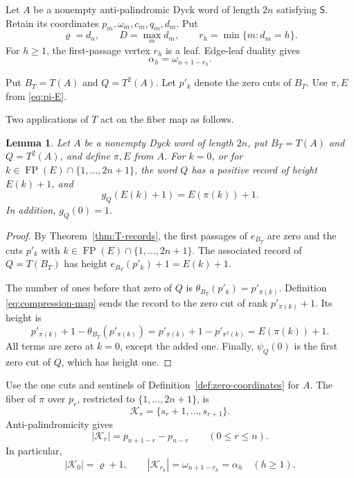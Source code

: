 \documentclass[11pt]{article}
\newtheorem{lemma}[theorem]{Lemma}
\theoremstyle{definition}
\theoremstyle{remark}
\DeclareMathOperator{\FP}{FP}
\begin{document}
Let \(A\) be a nonempty anti-palindromic Dyck word of length \(2n\) satisfying
\(\mathsf S\).  Retain
its coordinates \(p_m,\omega_m,c_m,q_m,d_m\).  Put
\[
 \varrho=d_n,
 \qquad D=\max_m d_m,
 \qquad r_h=\min\{m:d_m=h\}.
\]
For \(h\geq1\), the first-passage vertex \(r_h\) is a leaf.  Edge-leaf
duality gives
\begin{equation*}
 \alpha_h=\omega_{n+1-r_h}.
\end{equation*}

Put \(B_T=T(A)\) and \(Q=T^2(A)\).  Let \(p'_k\) denote the zero cuts of
\(B_T\).  Use \(\pi,E\) from \eqref{eq:pi-E}.

Two applications of $T$ act on the fiber map as follows.
\begin{lemma}
\label{lem:double-T-fibers}
Let \(A\) be a nonempty Dyck word of length \(2n\), put
\(B_T=T(A)\) and \(Q=T^2(A)\), and define \(\pi,E\) from \(A\).
For \(k=0\), or for
\(k\in\FP(E)\cap\{1,\ldots,2n+1\}\), the word \(Q\) has a positive record
of height \(E(k)+1\), and
\begin{equation*}
 g_Q(E(k)+1)=E(\pi(k))+1.
\end{equation*}
In addition, \(g_Q(0)=1\).
\end{lemma}

\begin{proof}
By Theorem~\ref{thm:T-records}, the first passages of \(e_{B_T}\) are zero
and the cuts \(p'_k\) with
\(k\in\FP(E)\cap\{1,\ldots,2n+1\}\).  The associated record of
\(Q=T(B_T)\) has height \(e_{B_T}(p'_k)+1=E(k)+1\).

The number of ones before that zero of \(Q\) is
\(\theta_{B_T}(p'_k)=p'_{\pi(k)}\).  Definition
\eqref{eq:compression-map} sends the record to the zero cut of rank
\(p'_{\pi(k)}+1\).  Its height is
\[
 p'_{\pi(k)}+1-\theta_{B_T}(p'_{\pi(k)})
 =p'_{\pi(k)}+1-p'_{\pi^2(k)}
 =E(\pi(k))+1.
\]
All terms are zero at \(k=0\), except the added one.  Finally,
\(\psi_Q(0)\) is the first zero cut of \(Q\), which has height one.
\end{proof}

Use the one cuts and sentinels of Definition~\ref{def:zero-coordinates} for
\(A\).
The fiber of \(\pi\) over \(p_r\), restricted to
\(\{1,\ldots,2n+1\}\), is
\begin{equation*}
 \mathcal K_r=\{s_r+1,\ldots,s_{r+1}\}.
\end{equation*}
Anti-palindromicity gives
\begin{equation*}
 |\mathcal K_r|=p_{n+1-r}-p_{n-r}
 \qquad(0\leq r\leq n).
\end{equation*}
In particular,
\begin{equation}
\label{eq:K-boundaries}
 |\mathcal K_0|=\varrho+1,
 \qquad
 |\mathcal K_{r_h}|=\omega_{n+1-r_h}=\alpha_h\quad(h\geq1).
\end{equation}
\end{document}
